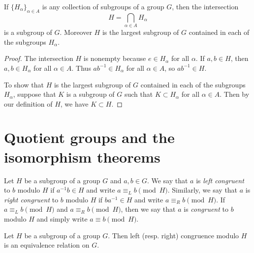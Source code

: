\begin{theorem}
    \label{thm:intersection-subgroups}
    If \(\{H_{\alpha}\}_{\alpha \in A}\) is any collection of subgroups of a
    group \(G\), then the intersection
    \[
        H = \bigcap_{\alpha \in A} H_{\alpha}
    \]
    is a subgroup of \(G\). Moreover \(H\) is the largest subgroup of \(G\)
    contained in each of the subgroups \(H_{\alpha}\).
\end{theorem}

\begin{proof}
    The intersection \(H\) is nonempty because \(e \in H_\alpha\) for all
    \(\alpha\). If \(a, b \in H\), then \(a, b \in H_\alpha\) for all \(\alpha
    \in A\). Thus \(ab^{-1} \in H_\alpha\) for all \(\alpha \in A\), so
    \(ab^{-1} \in H\).

    To show that \(H\) is the largest subgroup of \(G\) contained in each of the
    subgroups \(H_{\alpha}\), suppose that \(K\) is a subgroup of \(G\) such
    that \(K \subset H_{\alpha}\) for all \(\alpha \in A\). Then by our
    definition of \(H\), we have \(K \subset H\).
\end{proof}

\section{Quotient groups and the isomorphism theorems}

\begin{definition}
    Let \(H\) be a subgroup of a group \(G\) and \(a, b \in G\). We say that
    \(a\) is \emph{left congruent} to \(b\) modulo \(H\) if \(a^{-1}b \in H\)
    and write \(a \equiv_L b \pmod{H}\). Similarly, we say that \(a\) is
    \emph{right congruent} to \(b\) modulo \(H\) if \(ba^{-1} \in H\) and write
    \(a \equiv_R b \pmod{H}\). If \(a \equiv_L b \pmod{H}\) and \(a \equiv_R b
    \pmod{H}\), then we say that \(a\) is \emph{congruent} to \(b\) modulo \(H\)
    and simply write \(a \equiv b \pmod{H}\).
\end{definition}

\begin{theorem}
    Let \(H\) be a subgroup of a group \(G\). Then left (resp. right) congruence
    modulo \(H\) is an equivalence relation on \(G\).
\end{theorem}

